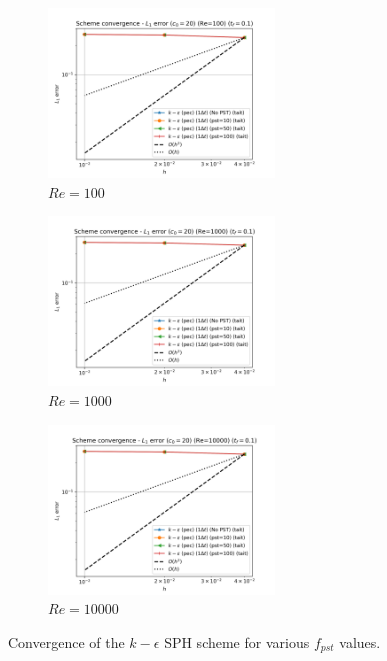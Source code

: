 \begin{figure}[H]
  \begin{subfigure}{7cm}
    \centering\includegraphics[width=6cm]{Code-Figures/keps/pst/dt_pois_conv_c0_20_re_100.png}
    \caption{$Re = 100$}
  \end{subfigure}
  \begin{subfigure}{7cm}
    \centering\includegraphics[width=6cm]{Code-Figures/keps/pst/dt_pois_conv_c0_20_re_1000.png}
    \caption{$Re = 1000$}
  \end{subfigure}
  \begin{subfigure}{7cm}
    \centering\includegraphics[width=6cm]{Code-Figures/keps/pst/dt_pois_conv_c0_20_re_10000.png}
    \caption{$Re = 10000$}
  \end{subfigure}
  \caption{Convergence of the $k-\epsilon$ SPH scheme for various $f_{pst}$ values.}
  \label{fig:keps-pst}
\end{figure}

